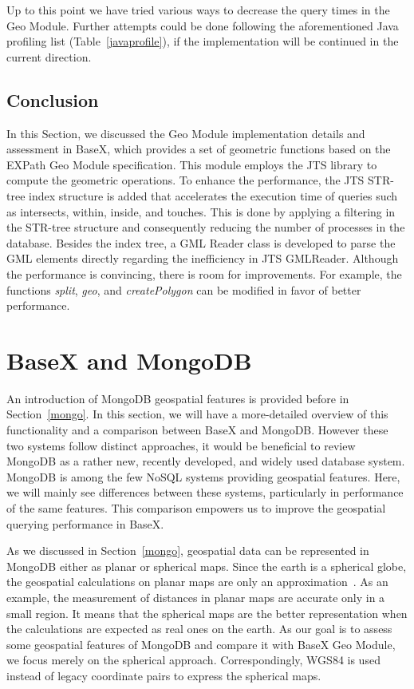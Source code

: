 \documentclass[a4paper,12pt]{article}
\begin{document}
Up to this point we have tried various ways to decrease the query times in the Geo Module. Further attempts could be done following the aforementioned Java profiling list (Table~\ref{javaprofile}), if the implementation will be continued in the current direction.

\subsection{Conclusion}
\label{BXconc}
In this Section, we discussed the Geo Module implementation details and assessment in BaseX, which provides a set of geometric functions based on the EXPath Geo Module specification. This module employs the JTS library to compute the geometric operations. To enhance the performance, the JTS STR-tree index structure is added that accelerates the execution time of queries such as intersects, within, inside, and touches. This is done by applying a filtering in the STR-tree structure and consequently reducing the number of processes in the database. Besides the index tree, a GML Reader class is developed to parse the GML elements directly regarding the inefficiency in JTS GMLReader. Although the performance is convincing, there is room for improvements. For example, the functions \textit{split}, \textit{geo}, and \textit{createPolygon} can be modified in favor of better performance.

\newpage
\section{BaseX and MongoDB}
\label{s.mongo}

An introduction of MongoDB geospatial features is provided before in Section~\ref{mongo}. In this section, we will have a more-detailed overview of this functionality and a comparison between BaseX and MongoDB. However these two systems follow distinct approaches, it would be beneficial to review MongoDB as a rather new, recently developed, and widely used database system. MongoDB is among the few NoSQL systems providing geospatial features. Here, we will mainly see differences between these systems, particularly in performance of the same features. This comparison empowers us to improve the geospatial querying performance in BaseX. 

As we discussed in Section~\ref{mongo}, geospatial data can be represented in Mongo\-DB either as planar or spherical maps. Since the earth is a spherical globe, the geospatial calculations on planar maps are only an approximation~\cite{coordsys,coordsys-mongo}. As an example, the measurement of distances in planar maps are accurate only in a small region. It means that the spherical maps are the better representation when the calculations are expected as real ones on the earth. As our goal is to assess some geospatial features of MongoDB and compare it with BaseX Geo Module, we focus merely on the spherical approach. Correspondingly, WGS84 is used instead of legacy coordinate pairs to express the spherical maps. 
\end{document}
